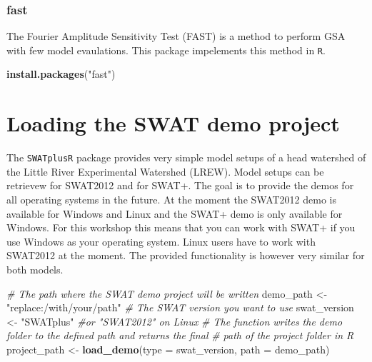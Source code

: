 \documentclass[11pt,]{article}
\newenvironment{Shaded}{}{}
\newcommand{\KeywordTok}[1]{\textcolor[rgb]{0.00,0.44,0.13}{\textbf{#1}}}
\newcommand{\DataTypeTok}[1]{\textcolor[rgb]{0.56,0.13,0.00}{#1}}
\newcommand{\StringTok}[1]{\textcolor[rgb]{0.25,0.44,0.63}{#1}}
\newcommand{\CommentTok}[1]{\textcolor[rgb]{0.38,0.63,0.69}{\textit{#1}}}
\newcommand{\NormalTok}[1]{#1}
\begin{document}
\subsubsection{fast}\label{fast}

The Fourier Amplitude Sensitivity Test (FAST) is a method to perform GSA
with few model evaulations. This package impelements this method in
\texttt{R}.

\begin{Shaded}
\begin{Highlighting}[]
\KeywordTok{install.packages}\NormalTok{(}\StringTok{"fast"}\NormalTok{)}
\end{Highlighting}
\end{Shaded}

\newpage

\section{Loading the SWAT demo
project}\label{loading-the-swat-demo-project}

The \texttt{SWATplusR} package provides very simple model setups of a
head watershed of the Little River Experimental Watershed (LREW). Model
setups can be retrievew for SWAT2012 and for SWAT+. The goal is to
provide the demos for all operating systems in the future. At the moment
the SWAT2012 demo is available for Windows and Linux and the SWAT+ demo
is only available for Windows. For this workshop this means that you can
work with SWAT+ if you use Windows as your operating system. Linux users
have to work with SWAT2012 at the moment. The provided functionality is
however very similar for both models.

\begin{Shaded}
\begin{Highlighting}[]
\CommentTok{# The path where the SWAT demo project will be written}
\NormalTok{demo_path <-}\StringTok{ "replace:/with/your/path"}
\CommentTok{# The SWAT version you want to use}
\NormalTok{swat_version <-}\StringTok{ "SWATplus"} \CommentTok{#or "SWAT2012" on Linux}
\CommentTok{# The function writes the demo folder to the defined path and returns the final}
\CommentTok{# path of the project folder in R}
\NormalTok{project_path <-}\StringTok{ }\KeywordTok{load_demo}\NormalTok{(}\DataTypeTok{type =}\NormalTok{ swat_version, }\DataTypeTok{path =}\NormalTok{ demo_path)}
\end{Highlighting}
\end{Shaded}
\newpage
\singlespacing
\end{document}

